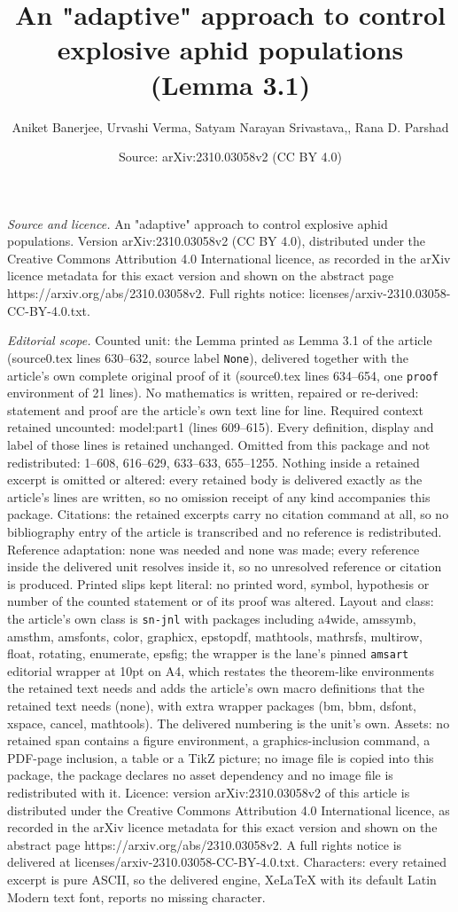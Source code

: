 \documentclass[10pt,a4paper]{amsart}
\title[An "adaptive" approach to control explosive aphid population]{An "adaptive" approach to control explosive aphid populations (Lemma 3.1)}
\author{Aniket Banerjee, Urvashi Verma, Satyam Narayan Srivastava,, Rana D. Parshad}
\date{Source: arXiv:2310.03058v2 (CC BY 4.0)}
\begin{document}
\maketitle

\noindent\emph{Source and licence.} An "adaptive" approach to control explosive aphid populations. Version arXiv:2310.03058v2 (CC BY 4.0), distributed under the Creative Commons Attribution 4.0 International licence, as recorded in the arXiv licence metadata for this exact version and shown on the abstract page https://arxiv.org/abs/2310.03058v2. Full rights notice: licenses/arxiv-2310.03058-CC-BY-4.0.txt.\par\smallskip

\noindent\textit{Editorial scope.} Counted unit: the Lemma printed as Lemma 3.1 of the article (source0.tex lines 630--632, source label \texttt{None}), delivered together with the article's own complete original proof of it (source0.tex lines 634--654, one \texttt{proof} environment of 21 lines). No mathematics is written, repaired or re-derived: statement and proof are the article's own text line for line. Required context retained uncounted: model:part1 (lines 609--615). Every definition, display and label of those lines is retained unchanged. Omitted from this package and not redistributed: 1--608, 616--629, 633--633, 655--1255. Nothing inside a retained excerpt is omitted or altered: every retained body is delivered exactly as the article's lines are written, so no omission receipt of any kind accompanies this package. Citations: the retained excerpts carry no citation command at all, so no bibliography entry of the article is transcribed and no reference is redistributed. Reference adaptation: none was needed and none was made; every reference inside the delivered unit resolves inside it, so no unresolved reference or citation is produced. Printed slips kept literal: no printed word, symbol, hypothesis or number of the counted statement or of its proof was altered. Layout and class: the article's own class is \texttt{sn-jnl} with packages including a4wide, amssymb, amsthm, amsfonts, color, graphicx, epstopdf, mathtools, mathrsfs, multirow, float, rotating, enumerate, epsfig; the wrapper is the lane's pinned \texttt{amsart} editorial wrapper at 10pt on A4, which restates the theorem-like environments the retained text needs and adds the article's own macro definitions that the retained text needs (none), with extra wrapper packages (bm, bbm, dsfont, xspace, cancel, mathtools). The delivered numbering is the unit's own. Assets: no retained span contains a figure environment, a graphics-inclusion command, a PDF-page inclusion, a table or a TikZ picture; no image file is copied into this package, the package declares no asset dependency and no image file is redistributed with it. Licence: version arXiv:2310.03058v2 of this article is distributed under the Creative Commons Attribution 4.0 International licence, as recorded in the arXiv licence metadata for this exact version and shown on the abstract page https://arxiv.org/abs/2310.03058v2. A full rights notice is delivered at licenses/arxiv-2310.03058-CC-BY-4.0.txt. Characters: every retained excerpt is pure ASCII, so the delivered engine, XeLaTeX with its default Latin Modern text font, reports no missing character.
\end{document}
